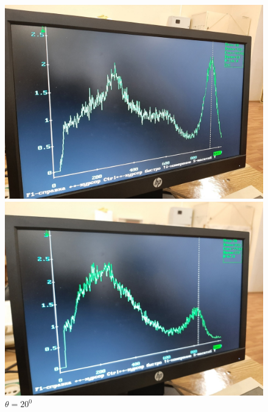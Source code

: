 \documentclass[a4paper, 12pt]{article}
\begin{document}
\begin{figure}[h]
\begin{minipage}[h]{0.3\linewidth}
\includegraphics[width = 1\linewidth]{10.jpg}
\caption{$\theta = 10^0$}
\end{minipage}
\hfill
\begin{minipage}[h]{0.3\linewidth}
\includegraphics[width = 1\linewidth]{20.jpg}
\caption{$\theta = 20^0$}
\end{minipage}
\hfill
\begin{minipage}[h]{0.3\linewidth}

\end{minipage}
\end{figure}
\end{document}
